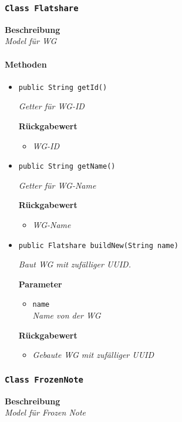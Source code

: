      \subsubsection{\texttt{Class Flatshare}}
     \textbf{Beschreibung} \\
     \textit{Model für WG}
     \paragraph*{Methoden}
     \begin{itemize}
     	\item{\texttt{public String getId()}}
     	
     	\textit{Getter für WG-ID}
     	
     	\textbf{Rückgabewert}
     	\begin{itemize}
     		\item\textit{WG-ID}
     	\end{itemize}
     
     \item{\texttt{public String getName()}}
     	
     	\textit{Getter für WG-Name}
     	
     	\textbf{Rückgabewert}
     	\begin{itemize}
     		\item\textit{WG-Name}
     	\end{itemize}
     
     \item{\texttt{public Flatshare buildNew(String name)}}
     	
     	\textit{Baut WG mit zufälliger UUID.}
     	
     	\textbf{Parameter}
     	\begin{itemize}
     		\item\texttt{name}\\
     		\textit{Name von der WG}
     	\end{itemize}
     
     	\textbf{Rückgabewert}
     	\begin{itemize}
     		\item\textit{Gebaute WG mit zufälliger UUID}
     	\end{itemize}
     \end{itemize}
 
     \subsubsection{\texttt{Class FrozenNote}}
     \textbf{Beschreibung} \\
     \textit{Model für Frozen Note}
